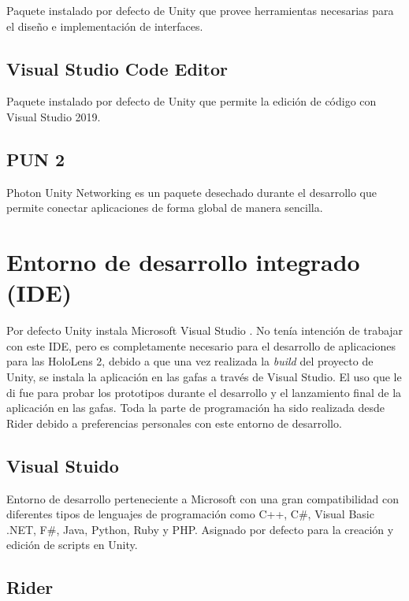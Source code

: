 Paquete instalado por defecto de Unity que provee herramientas necesarias para el diseño e implementación de interfaces.

\subsection{Visual Studio Code Editor}

Paquete instalado por defecto de Unity que permite la edición de código con Visual Studio 2019.

\subsection{PUN 2}

Photon Unity Networking \cite{pun:pun} es un paquete desechado durante el desarrollo que permite conectar aplicaciones de forma global de manera sencilla.

\section{Entorno de desarrollo integrado (IDE)}

Por defecto Unity instala Microsoft Visual Studio \cite{visual:studio}. No tenía intención de trabajar con este IDE, pero es completamente necesario para el desarrollo de aplicaciones para las HoloLens 2, debido a que una vez realizada la \textit{build} del proyecto de Unity, se instala la aplicación en las gafas a través de Visual Studio. El uso que le di fue para probar los prototipos durante el desarrollo y el lanzamiento final de la aplicación en las gafas. Toda la parte de programación ha sido realizada desde Rider \cite{jetbrain:rider} debido a preferencias personales con este entorno de desarrollo.

\subsection{Visual Stuido}

Entorno de desarrollo perteneciente a Microsoft con una gran compatibilidad con diferentes tipos de lenguajes de programación como C++, C\#, Visual Basic .NET, F\#, Java, Python, Ruby y PHP. Asignado por defecto para la creación y edición de scripts en Unity.

\subsection{Rider}

